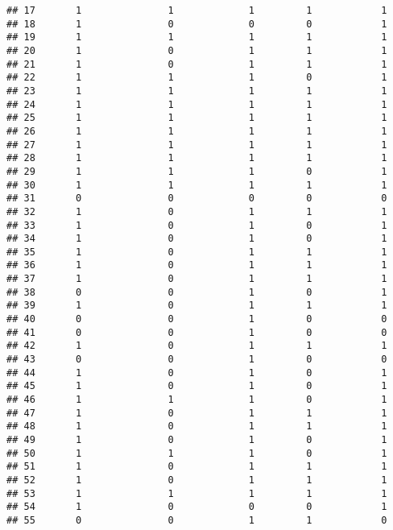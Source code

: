 \documentclass[]{article}
\begin{document}
\begin{verbatim}
## 17       1               1             1         1            1
## 18       1               0             0         0            1
## 19       1               1             1         1            1
## 20       1               0             1         1            1
## 21       1               0             1         1            1
## 22       1               1             1         0            1
## 23       1               1             1         1            1
## 24       1               1             1         1            1
## 25       1               1             1         1            1
## 26       1               1             1         1            1
## 27       1               1             1         1            1
## 28       1               1             1         1            1
## 29       1               1             1         0            1
## 30       1               1             1         1            1
## 31       0               0             0         0            0
## 32       1               0             1         1            1
## 33       1               0             1         0            1
## 34       1               0             1         0            1
## 35       1               0             1         1            1
## 36       1               0             1         1            1
## 37       1               0             1         1            1
## 38       0               0             1         0            1
## 39       1               0             1         1            1
## 40       0               0             1         0            0
## 41       0               0             1         0            0
## 42       1               0             1         1            1
## 43       0               0             1         0            0
## 44       1               0             1         0            1
## 45       1               0             1         0            1
## 46       1               1             1         0            1
## 47       1               0             1         1            1
## 48       1               0             1         1            1
## 49       1               0             1         0            1
## 50       1               1             1         0            1
## 51       1               0             1         1            1
## 52       1               0             1         1            1
## 53       1               1             1         1            1
## 54       1               0             0         0            1
## 55       0               0             1         1            0

\end{verbatim}
\end{document}

